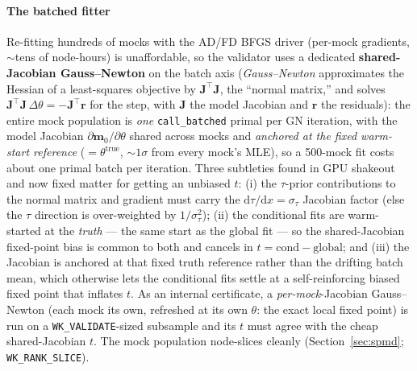 \documentclass[11pt]{article}
\newcommand{\code}[1]{\texttt{\small #1}}
\begin{document}
\paragraph{The batched fitter}
Re-fitting hundreds of mocks with the AD/FD BFGS driver (per-mock gradients,
$\sim$tens of node-hours) is unaffordable, so the validator uses a dedicated
\textbf{shared-Jacobian Gauss--Newton} on the batch axis (\emph{Gauss--Newton}
approximates the Hessian of a least-squares objective by $\bm J^\top\bm J$,
the ``normal matrix,'' and solves $\bm J^\top\bm J\,\Delta\theta=-\bm
J^\top\bm r$ for the step, with $\bm J$ the model Jacobian and $\bm r$ the
residuals): the entire mock
population is \emph{one} \code{call\_batched} primal per GN iteration, with
the model Jacobian $\partial\bm m_0/\partial\theta$ shared across mocks and
\emph{anchored at the fixed warm-start reference} ($=\theta^{\mathrm{true}}$,
$\sim\!1\sigma$ from every mock's MLE), so a 500-mock fit costs about one
primal batch per iteration. Three subtleties found in GPU shakeout and now
fixed matter for getting an unbiased $t$: (i) the $\tau$-prior contributions
to the normal matrix and gradient must carry the $\mathrm d\tau/\mathrm dx =
\sigma_\tau$ Jacobian factor (else the $\tau$ direction is over-weighted by
$1/\sigma_\tau^2$); (ii) the conditional fits are warm-started at the
\emph{truth} --- the same start as the global fit --- so the shared-Jacobian
fixed-point bias is common to both and cancels in $t=\mathrm{cond}-
\mathrm{global}$; and (iii) the Jacobian is anchored at that fixed truth
reference rather than the drifting batch mean, which otherwise lets the
conditional fits settle at a self-reinforcing biased fixed point that
inflates $t$. As an internal certificate, a \emph{per-mock}-Jacobian
Gauss--Newton (each mock its own, refreshed at its own $\theta$: the exact
local fixed point) is run on a \code{WK\_VALIDATE}-sized subsample and its
$t$ must agree with the cheap shared-Jacobian $t$. The mock population
node-slices cleanly (Section~\ref{sec:spmd}; \code{WK\_RANK\_SLICE}).
\end{document}
